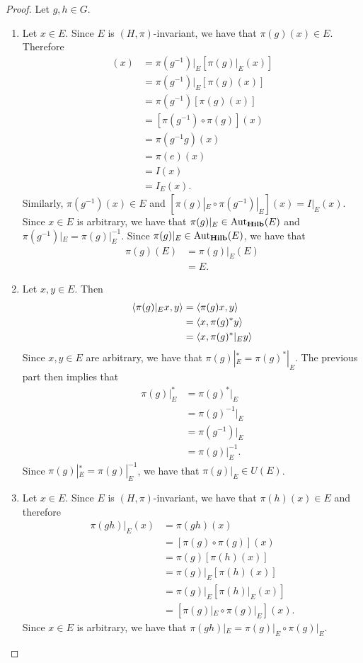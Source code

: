 \documentclass{book}
\begin{document}
	\begin{proof}
		Let $g,h \in G$. 
		\begin{enumerate}
			\item Let $x \in E$. Since $E$ is $(H, \pi)$-invariant, we have that $\pi(g)(x) \in E$. Therefore
			\begin{align*}
				[\pi(g^{-1})|_E \circ \pi(g)|_E](x) 
				& = \pi(g^{-1})|_E [\pi(g)|_E(x)] \\
				& = \pi(g^{-1})|_E [\pi(g)(x)] \\
				& = \pi(g^{-1}) [\pi(g)(x) ] \\
				& = [\pi(g^{-1}) \circ \pi(g)](x)  \\
				& = \pi(g^{-1} g)(x) \\
				& = \pi(e)(x) \\
				& = I(x) \\
				& = I_E(x).
			\end{align*}
			Similarly, $\pi(g^{-1})(x) \in E$ and $[\pi(g)|_E \circ \pi(g^{-1})|_E](x) = I|_E(x)$. Since $x \in E$ is arbitrary, we have that $\pi(g)|_E \in \operatorname{Aut}_{\operatorname*{\text{\textbf{Hilb}}}}(E)$ and $\pi(g^{-1})|_E = \pi(g)|_E^{-1}$. Since $\pi(g)|_E \in \operatorname{Aut}_{\operatorname*{\text{\textbf{Hilb}}}}(E)$, we have that
			\begin{align*}
				\pi(g)(E)
				& = \pi(g)|_E(E) \\
				& = E.
			\end{align*}
			\item Let $x, y \in E$. Then 
			\begin{align*}
				\langle \pi(g)|_E x, y \rangle
				& = \langle \pi(g) x, y \rangle \\
				& = \langle x, \pi(g)^* y \rangle \\
				& = \langle x, \pi(g)^*|_E y \rangle \\
			\end{align*}
			Since $x, y \in E$ are arbitrary, we have that $\pi(g)|_E^* = \pi(g)^*|_E$. The previous part then implies that 
			\begin{align*}
				\pi(g)|_E^* 
				& = \pi(g)^*|_E \\
				& = \pi(g)^{-1}|_E \\
				& = \pi(g^{-1})|_E \\
				& = \pi(g)|_E^{-1}.
			\end{align*}
			Since $\pi(g)|_E^* =  \pi(g)|_E^{-1}$, we have that $\pi(g)|_E \in U(E)$.
			\item Let $x \in E$. Since $E$ is $(H, \pi)$-invariant, we have that $\pi(h)(x) \in E$ and therefore 
			\begin{align*}
				\pi(g h)|_E(x)
				& = \pi(g h)(x) \\
				& = [\pi(g) \circ \pi(g)](x) \\
				& = \pi(g) [\pi(h)(x)] \\
				& = \pi(g)|_E [\pi(h)(x)] \\
				& = \pi(g)|_E [\pi(h)|_E(x)] \\
				& = [\pi(g)|_E \circ \pi(g)|_E](x).
			\end{align*}
			Since $x \in E$ is arbitrary, we have that $\pi(g h)|_E = \pi(g)|_E \circ \pi(g)|_E$.
		\end{enumerate}
	\end{proof}
	
\end{document}

